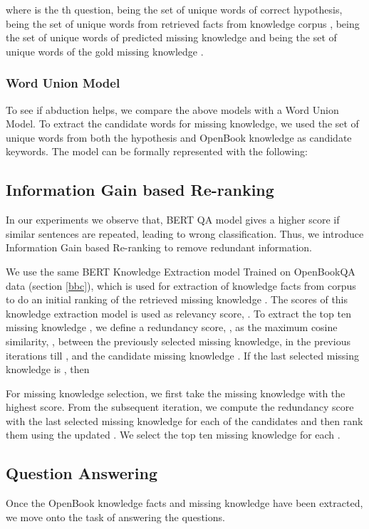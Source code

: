 \documentclass[11pt,a4paper]{article}
\begin{document}
where  is the th question,  being the set of unique words of correct hypothesis,  being the set of unique words from retrieved facts from knowledge corpus ,  being the set of unique words of predicted missing knowledge and  being the set of unique words of the gold missing knowledge .



\subsubsection{Word Union Model}


To see if abduction helps, we compare the above models with a Word Union Model.
To extract the candidate words for missing knowledge, we used the set of unique words from both the hypothesis and OpenBook knowledge as candidate keywords. The model can be formally represented with the following:



\subsection{Information Gain based Re-ranking}
In our experiments we observe that, BERT QA model gives a higher score if similar sentences are repeated, leading to wrong classification. Thus, we introduce Information Gain based Re-ranking to remove redundant information.

We use the same BERT Knowledge Extraction model Trained on OpenBookQA data (section \ref{bbc}), which is used for extraction of knowledge facts from corpus  to do an initial ranking of the retrieved missing knowledge . The scores of this knowledge extraction model is used as relevancy score, . To extract the top ten missing knowledge , we define a redundancy score,  , as the maximum cosine similarity, , between the previously selected missing knowledge, in the previous iterations till , and the candidate missing knowledge . 
If the last selected missing knowledge is , then



For missing knowledge selection, we first take the missing knowledge with the highest  score. From the subsequent iteration, we compute the redundancy score with the last selected missing knowledge for each of the candidates and then rank them using the updated . We select the top ten missing knowledge for each . 

\subsection{Question Answering}
Once the OpenBook knowledge facts  and missing knowledge  have been extracted, we move onto the task of answering the questions. 
\end{document}
